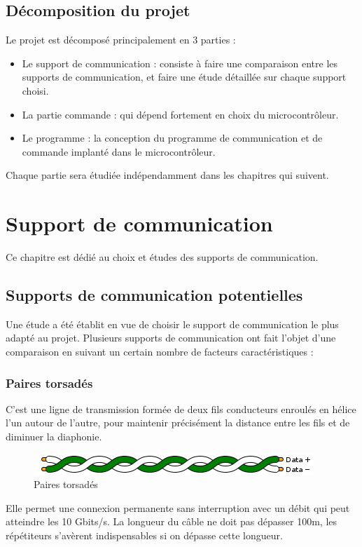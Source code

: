 \documentclass[11pt, a4paper, twoside]{book}
\begin{document}
\section{Décomposition du projet}
Le projet est décomposé principalement en 3 parties :
\begin{itemize}
\item Le support de communication : consiste à faire une comparaison entre les supports de communication, et faire une étude détaillée sur chaque support choisi.
\item La partie commande : qui dépend fortement en choix du microcontrôleur.
\item Le programme : la conception du programme de communication et de commande implanté dans le microcontrôleur.
\end{itemize}

Chaque partie sera étudiée indépendamment dans les chapitres qui suivent.

\chapter{Support de communication}
Ce chapitre est dédié au choix et études des supports de communication.
\section{Supports de communication potentielles}
Une étude a été établit en vue de choisir le support de communication le plus adapté au projet. Plusieurs supports de communication ont fait l’objet d’une comparaison en suivant un certain nombre de facteurs caractéristiques :
\subsection{Paires torsadés}
C’est une ligne de transmission formée de deux fils conducteurs enroulés en hélice l’un autour de l’autre, pour maintenir précisément la distance entre les fils et de diminuer la diaphonie.
\begin{figure}[h!]
\centering
\includegraphics[width=\textwidth]{twistedPair}
\caption{Paires torsadés}
\end{figure}
Elle permet une connexion permanente sans interruption avec un débit qui peut atteindre les 10 Gbits/s. La longueur du câble ne doit pas dépasser 100m, les répétiteurs s'avèrent indispensables si on dépasse cette longueur.
\end{document}

